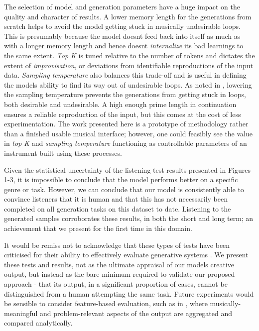 \documentclass[sigconf]{nimeart}
\begin{document}
The selection of model and generation parameters have a huge impact on the quality and character of results. A lower memory length for the generations from scratch helps to avoid the model getting stuck in musically undesirable loops. This is presumably because the model doesn\textquotesingle t feed back into itself as much as with a longer memory length and hence doesn\textquotesingle t \emph{internalize} its bad learnings to the same extent. \emph{Top K} is tuned relative to the number of tokens and dictates the extent of \emph{improvisation}, or deviations from identifiable reproductions of the input data. \emph{Sampling temperature} also balances this trade-off and is useful in defining the models ability to find its way out of undesirable loops. As noted in \cite{c8}, lowering the sampling temperature prevents the generations from getting stuck in loops, both desirable and undesirable. A high enough prime length in continuation ensures a reliable reproduction of the input, but this comes at the cost of less experimentation. The work presented here is a prototype of methodology rather than a finished usable musical interface; however, one could feasibly see the value in \emph{top K} and \emph{sampling temperature} functioning as controllable parameters of an instrument built using these processes.

Given the statistical uncertainty of the listening test results presented in Figures 1-3, it is impossible to conclude that the model performs better on a specific genre or task. However, we can conclude that our model is consistently able to convince listeners that it is human and that this has not necessarily been completed on all generation tasks on this dataset to date. Listening to the generated samples corroborates these results, in both the short and long term; an achievement that we present for the first time in this domain.

It would be remiss not to acknowledge that these types of tests have been criticised for their ability to effectively evaluate generative systems \cite{c31}. We present these tests and results, not as the ultimate appraisal of our models creative output, but instead as the bare minimum required to validate our proposed approach - that its output, in a significant proportion of cases, cannot be distinguished from a human attempting the same task. Future experiments would be sensible to consider feature-based evaluation, such as in \cite{c32}, where musically-meaningful and problem-relevant aspects of the output are aggregated and compared analytically.
\end{document}
